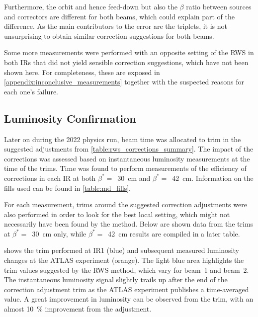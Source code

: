 Furthermore, the orbit and hence feed-down but also the \(\beta\) ratio between sources and correctors are different for both beams, which could explain part of the difference.
As the main contributors to the error are the triplets, it is not unsurprising to obtain similar correction suggestions for both beams.

Some more measurements were performed with an opposite setting of the \gls{RWS} in both \glspl{IR} that did not yield sensible correction suggestions, which have not been shown here.
For completeness, these are exposed in \cref{appendix:inconclusive_measurements} together with the suspected reasons for each one's failure.

\subsection{Luminosity Confirmation}
\label{subsection:lumi_correction_trims}

Later on during the \num{2022} physics run, beam time was allocated to trim in the suggested adjustments from \cref{table:rws_corrections_summary}.
The impact of the corrections was assessed based on instantaneous luminosity measurements at the time of the trims.
Time was found to perform measurements of the efficiency of corrections in each IR at both \(\beta^{\ast} =\)~\qty{30}{\centi\meter} and \(\beta^{\ast} =\)~\qty{42}{\centi\meter}.
Information on the fills used can be found in \cref{table:md_fills}.

For each measurement, trims around the suggested correction adjustments were also performed in order to look for the best local setting, which might not necessarily have been found by the method.
Below are shown data from the trims at \(\beta^{\ast} =\)~\qty{30}{\centi\meter} only, while \(\beta^{\ast} =\)~\qty{42}{\centi\meter} results are compiled in a later table.

 shows the trim performed at IR\num{1} (\textcolor{mplblue}{blue}) and subsequent measured luminosity changes at the \acrshort{ATLAS} experiment (\textcolor{mplorange}{orange}).
The light blue area highlights the trim values suggested by the RWS method, which vary for beam~\num{1} and beam~\num{2}.
The instantaneous luminosity signal slightly trails up after the end of the correction adjustment trim as the ATLAS experiment publishes a time-averaged value.
A great improvement in luminosity can be observed from the trim, with an almost \qty{10}{\percent} improvement from the adjustment.

